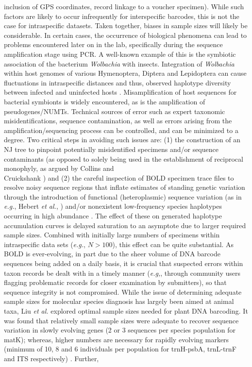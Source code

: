 inclusion of GPS coordinates, record linkage to a voucher specimen). While such factors are likely to occur infrequently for interspecific barcodes, this is not the case for intraspecific datasets. Taken together, biases in sample sizes  will likely be considerable. In certain cases, the occurrence of biological phenomena can lead to problems encountered later on in the lab, specifically during the sequence amplification stage using PCR. A well-known example of this is the symbiotic association of the bacterium \textit{Wolbachia} with insects. Integration of \textit{Wolbachia} within host genomes of various Hymenoptera, Diptera and Lepidoptera can cause fluctuations in intraspecific distances \cite{smith2012wolbachia} and thus, observed haplotype diversity between infected and uninfected hosts \cite{chen2017effects}. Misamplification of host sequences for \\ bacterial symbionts is widely encountered, as is the amplification of  pseudogenes/NUMTs. Technical sources of error such as expert taxonomic \\ misidentifications, sequence contamination, as well as errors arising from the \\ amplification/sequencing process can be controlled, and can be minimized to a degree. Two critical steps in avoiding such issues are: (1) the construction of an NJ tree to pinpoint potentially misidentified specimens and/or sequence contaminants (as opposed to solely being used in the establishment of reciprocal monophyly, as argued by Collins and \\ Cruickshank \cite{collins2013seven}) and (2) the careful inspection of BOLD specimen trace files to resolve noisy sequence regions that inflate estimates of standing genetic variation through the introduction of functional (heteroplasmic) sequence variation (as in \textit{e.g.}, Hebert \textit{et al.}, \cite{hebert2004ten}) and/or nonexistent low-frequency species haplotypes occurring in high abundance \cite{stoeckle2012frequency}. The effect of these on generated haplotype accumulation curves is delayed saturation to an asymptote due to larger required sample sizes. Combined with initially large numbers of specimens within intraspecific data sets (\textit{e.g.}, $N > 100$), this effect can be quite substantial. As BOLD is ever-evolving, in part due to the sheer volume of DNA barcode sequences being added on a daily basis, it is crucial that suspected errors within taxon records be dealt with in a timely manner (\textit{e.g,}, through community users flagging problematic records for closer examination by submitters), so that sequence integrity is not compromised. While the issue of determining adequate sample sizes for molecular species diagnosis has largely been aimed at animal taxa, Liu \textit{et al.} \cite{liu2012sampling} explored optimal sample sizes needed for plant DNA barcoding. It was found that relatively small sample sizes were adequate to recover sequence variation in slowly evolving genes (2 or 3 sequences per species population for matK); whereas, higher numbers are necessary for rapidly evolving markers (minimum of 10, 8 and 6 individuals per population for trnH-psbA, trnL-trnF and ITS respectively) \cite{liu2012sampling}. Further, 